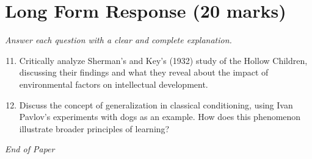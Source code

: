 \documentclass[12pt]{article}
\begin{document}
\section*{Long Form Response (20 marks)}
\textit{Answer each question with a clear and complete explanation.}
\begin{enumerate}[label=\arabic*.]
\setcounter{enumi}{10}
\item Critically analyze Sherman's and Key's (1932) study of the Hollow Children, discussing their findings and what they reveal about the impact of environmental factors on intellectual development.
\item Discuss the concept of generalization in classical conditioning, using Ivan Pavlov's experiments with dogs as an example. How does this phenomenon illustrate broader principles of learning?
\end{enumerate}

\vfill
\noindent\textit{End of Paper}
\end{document}
